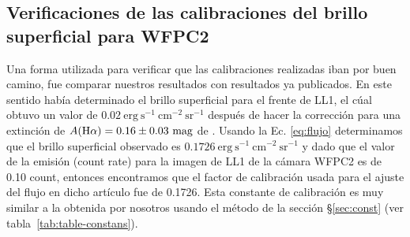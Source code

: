 \subsection{Verificaciones de las calibraciones del brillo superficial para WFPC2}
\label{sec:verifi}


Una  forma utilizada para verificar que las calibraciones realizadas iban por buen camino, fue comparar nuestros resultados con  resultados ya publicados. En este sentido \citet{Henney:2013a} había determinado el brillo superficial para el frente de LL1, el cúal obtuvo un valor de \(0.02\ \mathrm{erg\ s^{-1}\ cm^{-2}\ sr^{-1}}\) después de hacer la corrección para una extinción de \(A(\mathrm{H}\alpha{}) = 0.16 \pm 0.03\ \text{mag}\) de \ha{}. Usando la Ec. \ref{eq:flujo} determinamos que el brillo superficial observado es \(0.1726~\mathrm{erg\ s^{-1}\ cm^{-2}\ sr^{-1}}\) y dado que el valor de la emisión (count rate) para la imagen de LL1 de la cámara WFPC2 es de 0.10 count, entonces encontramos que el factor de calibración usada para el ajuste del flujo en dicho artículo fue de  0.1726. Esta constante de calibración es muy similar a la obtenida por nosotros usando el método de la sección \S\ref{sec:const} (ver tabla~\ref{tab:table-constans}).      

%

%
